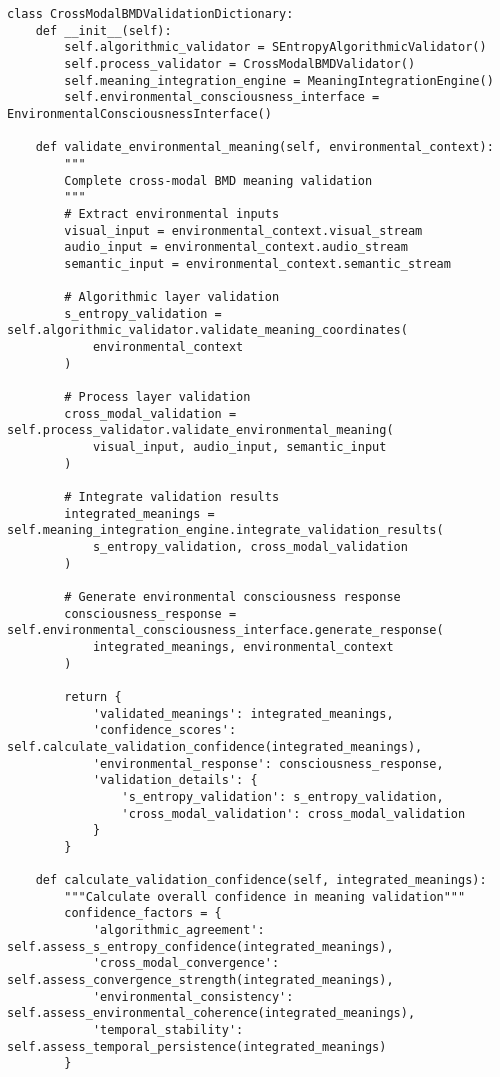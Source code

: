 \documentclass[12pt,a4paper]{article}
\begin{document}
\begin{lstlisting}[style=pythonstyle, caption=Complete CBVD Integration]
class CrossModalBMDValidationDictionary:
    def __init__(self):
        self.algorithmic_validator = SEntropyAlgorithmicValidator()
        self.process_validator = CrossModalBMDValidator()
        self.meaning_integration_engine = MeaningIntegrationEngine()
        self.environmental_consciousness_interface = EnvironmentalConsciousnessInterface()
        
    def validate_environmental_meaning(self, environmental_context):
        """
        Complete cross-modal BMD meaning validation
        """
        # Extract environmental inputs
        visual_input = environmental_context.visual_stream
        audio_input = environmental_context.audio_stream
        semantic_input = environmental_context.semantic_stream
        
        # Algorithmic layer validation
        s_entropy_validation = self.algorithmic_validator.validate_meaning_coordinates(
            environmental_context
        )
        
        # Process layer validation
        cross_modal_validation = self.process_validator.validate_environmental_meaning(
            visual_input, audio_input, semantic_input
        )
        
        # Integrate validation results
        integrated_meanings = self.meaning_integration_engine.integrate_validation_results(
            s_entropy_validation, cross_modal_validation
        )
        
        # Generate environmental consciousness response
        consciousness_response = self.environmental_consciousness_interface.generate_response(
            integrated_meanings, environmental_context
        )
        
        return {
            'validated_meanings': integrated_meanings,
            'confidence_scores': self.calculate_validation_confidence(integrated_meanings),
            'environmental_response': consciousness_response,
            'validation_details': {
                's_entropy_validation': s_entropy_validation,
                'cross_modal_validation': cross_modal_validation
            }
        }
    
    def calculate_validation_confidence(self, integrated_meanings):
        """Calculate overall confidence in meaning validation"""
        confidence_factors = {
            'algorithmic_agreement': self.assess_s_entropy_confidence(integrated_meanings),
            'cross_modal_convergence': self.assess_convergence_strength(integrated_meanings),
            'environmental_consistency': self.assess_environmental_coherence(integrated_meanings),
            'temporal_stability': self.assess_temporal_persistence(integrated_meanings)
        }
        

\end{lstlisting}
\end{document}

